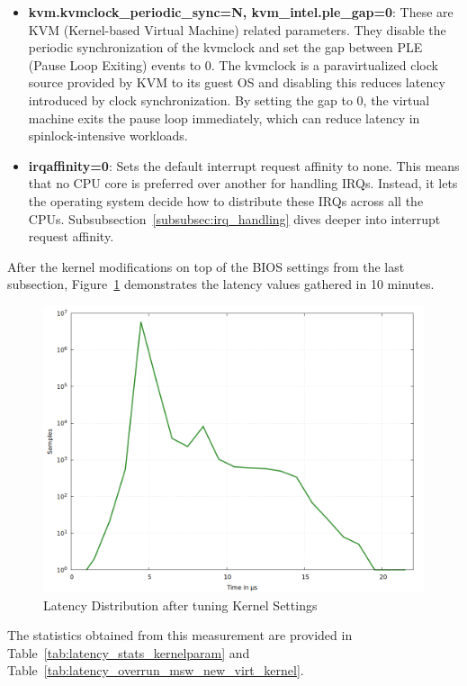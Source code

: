 \documentclass[MMR,Master,english]{twbook}
\begin{document}
\begin{itemize}
	\item \textbf{kvm.kvmclock\_periodic\_sync=N, kvm\_intel.ple\_gap=0}: These are KVM (Kernel-based Virtual Machine) related parameters. They disable the periodic synchronization of the kvmclock and set the gap between PLE (Pause Loop Exiting) events to 0. The kvmclock is a paravirtualized clock source provided by KVM to its guest OS and disabling this reduces latency introduced by clock synchronization. By setting the gap to 0, the virtual machine exits the pause loop immediately, which can reduce latency in spinlock-intensive workloads.
	\item \textbf{irqaffinity=0}: Sets the default interrupt request affinity to none. This means that no CPU core is preferred over another for handling IRQs. Instead, it lets the operating system decide how to distribute these IRQs across all the CPUs. Subsubsection~\ref{subsubsec:irq_handling} dives deeper into interrupt request affinity.
\end{itemize}

\clearpage

\noindent After the kernel modifications on top of the BIOS settings from the last subsection, Figure~\ref{fig:gnuplot_max_latency_rt_kernelparam} demonstrates the latency
values gathered in 10 minutes.

\begin{figure}[H]
	\centering
	\includegraphics[width=0.7\columnwidth]{masterthesis-documentation/docs/sigmatek/xenomai/4rt_kernelparam/gnuplot_max_latency_rt_kernelparam.png}
	\caption[Latency Distribution after tuning Kernel Settings]{Latency Distribution after tuning Kernel Settings}
	\label{fig:gnuplot_max_latency_rt_kernelparam}
\end{figure}

\noindent The statistics obtained from this measurement are provided in Table~\ref{tab:latency_stats_kernelparam} and Table~\ref{tab:latency_overrun_msw_new_virt_kernel}.
\end{document}
